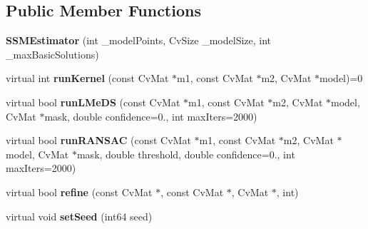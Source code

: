 \subsection*{Public Member Functions}
\begin{DoxyCompactItemize}
\item 
\hypertarget{classSSMEstimator_a1290f6c2c969bdb4205d1aa25355ac18}{{\bfseries S\-S\-M\-Estimator} (int \-\_\-model\-Points, Cv\-Size \-\_\-model\-Size, int \-\_\-max\-Basic\-Solutions)}\label{classSSMEstimator_a1290f6c2c969bdb4205d1aa25355ac18}

\item 
\hypertarget{classSSMEstimator_a8aae75823e16ae0b572d4ffc5b648a7f}{virtual int {\bfseries run\-Kernel} (const Cv\-Mat $\ast$m1, const Cv\-Mat $\ast$m2, Cv\-Mat $\ast$model)=0}\label{classSSMEstimator_a8aae75823e16ae0b572d4ffc5b648a7f}

\item 
\hypertarget{classSSMEstimator_a34c7187bd845a811d4d17915acde050b}{virtual bool {\bfseries run\-L\-Me\-D\-S} (const Cv\-Mat $\ast$m1, const Cv\-Mat $\ast$m2, Cv\-Mat $\ast$model, Cv\-Mat $\ast$mask, double confidence=0., int max\-Iters=2000)}\label{classSSMEstimator_a34c7187bd845a811d4d17915acde050b}

\item 
\hypertarget{classSSMEstimator_a7c8a769ed68ab3516cf223666183e16f}{virtual bool {\bfseries run\-R\-A\-N\-S\-A\-C} (const Cv\-Mat $\ast$m1, const Cv\-Mat $\ast$m2, Cv\-Mat $\ast$model, Cv\-Mat $\ast$mask, double threshold, double confidence=0., int max\-Iters=2000)}\label{classSSMEstimator_a7c8a769ed68ab3516cf223666183e16f}

\item 
\hypertarget{classSSMEstimator_a83c86f493396c837e449ff28da78fd72}{virtual bool {\bfseries refine} (const Cv\-Mat $\ast$, const Cv\-Mat $\ast$, Cv\-Mat $\ast$, int)}\label{classSSMEstimator_a83c86f493396c837e449ff28da78fd72}

\item 
\hypertarget{classSSMEstimator_a2cd712eeea767ffc6e9cb738578fed4d}{virtual void {\bfseries set\-Seed} (int64 seed)}\label{classSSMEstimator_a2cd712eeea767ffc6e9cb738578fed4d}

\end{DoxyCompactItemize}
